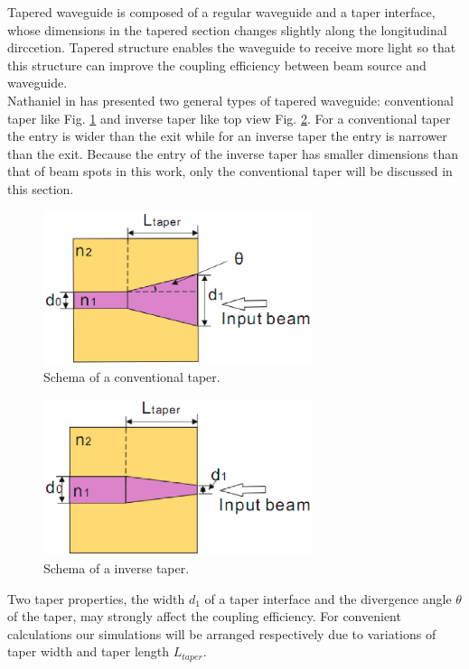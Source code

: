 Tapered waveguide is composed of a regular waveguide and a taper interface, whose dimensions in the tapered section changes slightly along the longitudinal dirccetion\cite{linear_tapered_waveguides}. Tapered structure enables the waveguide to receive more light so that this structure can improve the coupling efficiency between beam source and waveguide.\\  

Nathaniel in \cite{design_fabrication_tapered_waveguide} has presented two general types of tapered waveguide: conventional taper like Fig. \ref{fig:conventional_taper} and inverse taper like top view  Fig. \ref{fig:inverse_taper}. For a conventional taper the entry is wider than the exit while for an inverse taper the entry is narrower than the exit. Because the entry of the inverse taper has smaller dimensions than that of beam spots in this work, only the conventional taper will be discussed in this section.\\

\begin{figure}[!ht]
\centering
\includegraphics[width=0.7\textwidth]{bilder/convernational_taper}
\caption{Schema of a conventional taper.}
\label{fig:conventional_taper}
\end{figure}
\begin{figure}[!ht]
\centering
\includegraphics[width=0.7\textwidth]{bilder/inverse_taper}
\caption{Schema of a inverse taper.}
\label{fig:inverse_taper}
\end{figure}
Two taper properties, the width $d_{1}$ of a taper interface and the divergence angle $\theta$ of the taper, may strongly affect the coupling efficiency. For convenient calculations our simulations will be arranged respectively due to variations of taper width and taper length $L_{taper}$.
